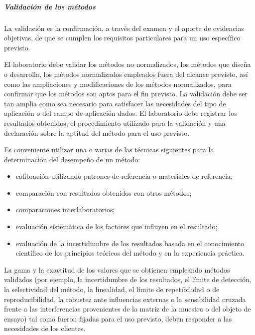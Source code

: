 \subparagraph{Validación de los métodos}
La validación es la confirmación, a través del examen y el aporte de evidencias objetivas, de que
se cumplen los requisitos particulares para un uso específico previsto.

\par \noindent
El laboratorio debe validar los métodos no normalizados, los métodos que diseña o desarrolla,
los métodos normalizados empleados fuera del alcance previsto, así como las ampliaciones y modificaciones
de los métodos normalizados, para confirmar que los métodos son aptos para el fin previsto. La validación
debe ser tan amplia como sea necesario para satisfacer las necesidades del tipo de aplicación o del campo
de aplicación dados. El laboratorio debe registrar los resultados obtenidos, el procedimiento utilizado para la
validación y una declaración sobre la aptitud del método para el uso previsto.

\par \noindent
Es conveniente utilizar una o varias de las técnicas siguientes para la determinación del desempeño de un
método:

\begin{itemize}
	\item calibración utilizando patrones de referencia o materiales de referencia;
	
	\item comparación con resultados obtenidos con otros métodos;
	
	\item comparaciones interlaboratorios;
	
	\item evaluación sistemática de los factores que influyen en el resultado;
	
	\item evaluación de la incertidumbre de los resultados basada en el conocimiento científico de los principios teóricos del
	método y en la experiencia práctica.
\end{itemize} 

\par \noindent
La gama y la exactitud de los valores que se obtienen empleando métodos validados (por
ejemplo, la incertidumbre de los resultados, el límite de detección, la selectividad del método, la linealidad, el
límite de repetibilidad o de reproducibilidad, la robustez ante influencias externas o la sensibilidad cruzada
frente a las interferencias provenientes de la matriz de la muestra o del objeto de ensayo) tal como fueron
fijadas para el uso previsto, deben responder a las necesidades de los clientes.


